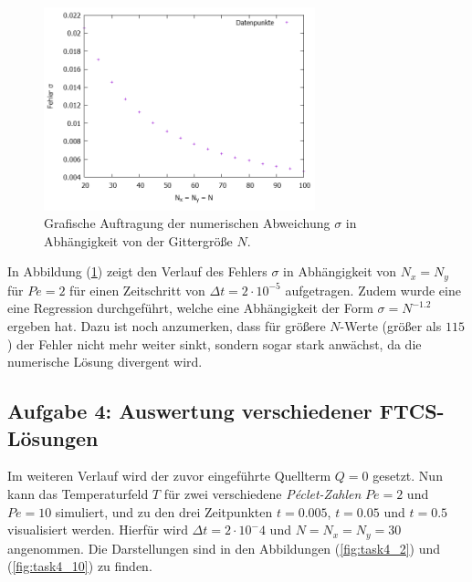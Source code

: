 \documentclass[12pt,a4paper,titlepage,headinclude,bibtotoc]{scrartcl}
\begin{document}
\begin{figure}[H]
 \centering
   \includegraphics[width=0.7\textwidth]{res/task3.png}
   \caption{Grafische Auftragung der numerischen Abweichung $\sigma$ in Abhängigkeit von der Gittergröße $N$.}
 \label{fig:task3}
\end{figure}

In Abbildung (\ref{fig:task3}) zeigt den Verlauf des Fehlers $\sigma$ in Abhängigkeit von $N_x = N_y$ für $Pe = 2$ für einen Zeitschritt von $\Delta t = 2 \cdot 10^{-5}$ aufgetragen.
Zudem wurde eine eine Regression durchgeführt, welche eine Abhängigkeit der Form $\sigma = N^{-1.2}$ ergeben hat. Dazu ist noch anzumerken, dass für größere $N$-Werte (größer als $115$) der Fehler nicht mehr weiter sinkt, sondern sogar stark anwächst, da die numerische Lösung divergent wird.


\subsection{Aufgabe 4: Auswertung verschiedener FTCS-Lösungen}
\label{sec:task4}
Im weiteren Verlauf wird der zuvor eingeführte Quellterm $Q=0$ gesetzt. Nun kann das Temperaturfeld $T$ für zwei verschiedene \textit{Péclet-Zahlen} $Pe = 2$ und $Pe = 10$ simuliert, und zu den drei Zeitpunkten $t = 0.005$, $t = 0.05$ und $t=0.5$ visualisiert werden. Hierfür wird $\Delta t = 2 \cdot 10^-4$ und $N=N_x=N_y = 30$ angenommen. Die Darstellungen sind in den Abbildungen (\ref{fig:task4_2}) und (\ref{fig:task4_10}) zu finden.
\end{document}
